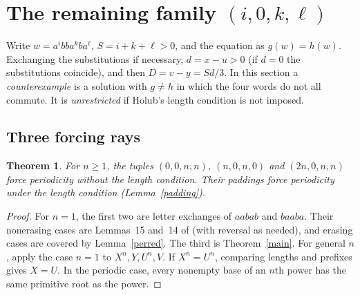 \documentclass[10pt]{article}
\newtheorem{theorem}{Theorem}
\theoremstyle{remark}\newtheorem*{remark}{Remark}
\begin{document}
\section{The remaining family \((i,0,k,\ell)\)}\label{sec:rem}
Write \(w=a^ibba^kba^\ell\), \(S=i+k+\ell>0\), and the equation as \(g(w)=h(w)\). Exchanging the substitutions if necessary, \(d=x-u>0\) (if \(d=0\) the substitutions coincide), and then \(D=v-y=Sd/3\). In this section a \emph{counterexample} is a solution with \(g\ne h\) in which the four words do not all commute. It is \emph{unrestricted} if Holub's length condition is not imposed.

\subsection{Three forcing rays}
\begin{theorem}\label{rays}
For \(n\ge1\), the tuples \((0,0,n,n)\), \((n,0,n,0)\) and \((2n,0,n,n)\) force periodicity without the length condition. Their paddings force periodicity under the length condition (Lemma~\ref{padding}).
\end{theorem}
\begin{proof}
For \(n=1\), the first two are letter exchanges of \(aabab\) and \(baaba\). Their nonerasing cases are Lemmas~15 and~14 of \cite{hs} (with reversal as needed), and erasing cases are covered by Lemma~\ref{perred}. The third is Theorem~\ref{main}. For general \(n\), apply the case \(n=1\) to \(X^n,Y,U^n,V\). If \(X^n=U^n\), comparing lengths and prefixes gives \(X=U\). In the periodic case, every nonempty base of an \(n\)th power has the same primitive root as the power.
\end{proof}
\end{document}
